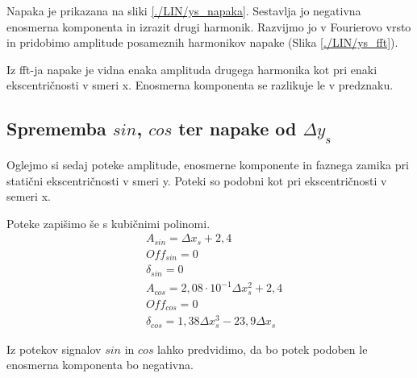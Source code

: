 Napaka je prikazana na sliki \ref{./LIN/ys_napaka}. Sestavlja jo negativna enosmerna komponenta in izrazit drugi harmonik.
Razvijmo jo v Fourierovo vrsto in pridobimo amplitude posameznih harmonikov napake (Slika \ref{./LIN/ys_fft}).

Iz fft-ja napake je vidna enaka amplituda drugega harmonika kot pri enaki ekscentričnosti v smeri x. Enosmerna komponenta se razlikuje le v predznaku.
\newpage
\subsection{Sprememba $sin$, $cos$ ter napake od $\Delta y_s$}

Oglejmo si sedaj poteke amplitude, enosmerne komponente in faznega zamika pri statični ekscentričnosti v smeri y. Poteki so podobni kot pri ekscentričnosti v semeri x.

Poteke zapišimo še s kubičnimi polinomi.
\begin{eqnarray}
\label{analog_lin_ys}
 &A_{sin} = \Delta x_s+2,4\\
 &Off_{sin} = 0 \\
 &\delta_{sin} =0 \\
 &A_{cos} = 2,08 \cdot 10^{-1} \Delta x_s^2+2,4\\
 &Off_{cos} = 0 \\
 &\delta_{cos} = 1,38 \Delta x_s^3- 23,9 \Delta x_s
\end{eqnarray}

Iz potekov signalov $sin$ in $cos$ lahko predvidimo, da bo potek podoben le enosmerna komponenta bo negativna.


